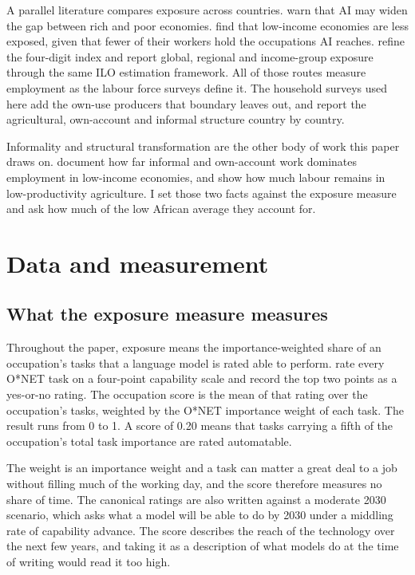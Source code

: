 A parallel literature compares exposure across countries. \citet{alonso2020}
warn that AI may widen the gap between rich and poor economies.
\citet{pizzinelli2023,cazzaniga2024,gmyrek2023} find that low-income economies
are less exposed, given that fewer of their workers hold the occupations AI
reaches. \citet{gmyrek2025} refine the four-digit index and report global,
regional and income-group exposure through the same ILO estimation framework.
All of those routes measure employment as the labour force surveys define it.
The household surveys used here add the own-use producers that boundary leaves
out, and report the agricultural, own-account and informal structure country by
country.

Informality and structural transformation are the other body of work this paper
draws on. \citet{laporta2014} document how far informal and own-account work
dominates employment in low-income economies, and \citet{gollin2014} show how
much labour remains in low-productivity agriculture. I set those two facts
against the exposure measure and ask how much of the low African average they
account for.

\section{Data and measurement}

\subsection{What the exposure measure measures}

Throughout the paper, exposure means the importance-weighted share of
an occupation's tasks that a language model is rated able to perform.
\citet{althoff2026} rate every O*NET task on a four-point capability scale and
record the top two points as a yes-or-no rating. The occupation score is the
mean of that rating over the occupation's tasks, weighted by the O*NET importance
weight of each task. The result runs from 0
to 1. A score of 0.20 means that tasks carrying a fifth of the occupation's total
task importance are rated automatable.

The weight is an importance weight and a task can matter a
great deal to a job without filling much of the working day, and the score
therefore measures no share of time. The canonical ratings are also written
against a moderate 2030 scenario, which asks what a model will be able to do by
2030 under a middling rate of capability advance. The score describes the reach
of the technology over the next few years, and taking it as a description of
what models do at the time of writing would read it too high.

